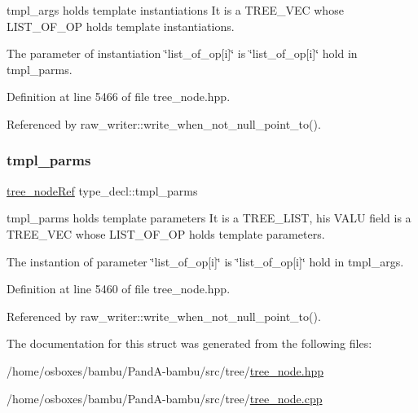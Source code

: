 tmpl\+\_\+args holds template instantiations It is a T\+R\+E\+E\+\_\+\+V\+EC whose L\+I\+S\+T\+\_\+\+O\+F\+\_\+\+OP holds template instantiations. 

The parameter of instantiation \char`\"{}list\+\_\+of\+\_\+op\mbox{[}i\mbox{]}\char`\"{} is \char`\"{}list\+\_\+of\+\_\+op\mbox{[}i\mbox{]}\char`\"{} hold in tmpl\+\_\+parms. 

Definition at line 5466 of file tree\+\_\+node.\+hpp.



Referenced by raw\+\_\+writer\+::write\+\_\+when\+\_\+not\+\_\+null\+\_\+point\+\_\+to().

\mbox{\label{structtype__decl_a732d128d7bebd2003722530182d56183}} 
\subsubsection{\texorpdfstring{tmpl\+\_\+parms}{tmpl\_parms}}
{\footnotesize\ttfamily \hyperlink{tree__node_8hpp_a6ee377554d1c4871ad66a337eaa67fd5}{tree\+\_\+node\+Ref} type\+\_\+decl\+::tmpl\+\_\+parms}



tmpl\+\_\+parms holds template parameters It is a T\+R\+E\+E\+\_\+\+L\+I\+ST, his V\+A\+LU field is a T\+R\+E\+E\+\_\+\+V\+EC whose L\+I\+S\+T\+\_\+\+O\+F\+\_\+\+OP holds template parameters. 

The instantion of parameter \char`\"{}list\+\_\+of\+\_\+op\mbox{[}i\mbox{]}\char`\"{} is \char`\"{}list\+\_\+of\+\_\+op\mbox{[}i\mbox{]}\char`\"{} hold in tmpl\+\_\+args. 

Definition at line 5460 of file tree\+\_\+node.\+hpp.



Referenced by raw\+\_\+writer\+::write\+\_\+when\+\_\+not\+\_\+null\+\_\+point\+\_\+to().



The documentation for this struct was generated from the following files\+:\begin{DoxyCompactItemize}
\item 
/home/osboxes/bambu/\+Pand\+A-\/bambu/src/tree/\hyperlink{tree__node_8hpp}{tree\+\_\+node.\+hpp}\item 
/home/osboxes/bambu/\+Pand\+A-\/bambu/src/tree/\hyperlink{tree__node_8cpp}{tree\+\_\+node.\+cpp}\end{DoxyCompactItemize}
